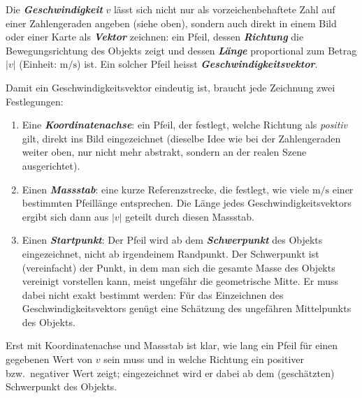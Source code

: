 \documentclass[addpoints,11pt,a4paper]{exam}
\begin{document}
\begin{theoriebox}
Die \textbf{\emph{Geschwindigkeit}} $v$ lässt sich nicht nur als
vorzeichenbehaftete Zahl auf einer Zahlengeraden angeben (siehe oben),
sondern auch direkt in einem Bild oder einer Karte als
\textbf{\emph{Vektor}} zeichnen: ein Pfeil, dessen \textbf{\emph{Richtung}}
die Bewegungsrichtung des Objekts zeigt und dessen \textbf{\emph{Länge}}
proportional zum Betrag $\lvert v\rvert$ (Einheit: $\si{\meter\per\second}$)
ist. Ein solcher Pfeil heisst \textbf{\emph{Geschwindigkeitsvektor}}.

Damit ein Geschwindigkeitsvektor eindeutig ist, braucht jede Zeichnung
zwei Festlegungen:

\begin{enumerate}[leftmargin=1.2cm,itemsep=0.25em]
  \item Eine \textbf{\emph{Koordinatenachse}}: ein Pfeil, der festlegt,
  welche Richtung als \emph{positiv} gilt, direkt ins Bild eingezeichnet
  (dieselbe Idee wie bei der Zahlengeraden weiter oben, nur nicht mehr
  abstrakt, sondern an der realen Szene ausgerichtet).
  \item Einen \textbf{\emph{Massstab}}: eine kurze Referenzstrecke, die
  festlegt, wie viele $\si{\meter\per\second}$ einer bestimmten Pfeillänge
  entsprechen. Die Länge jedes Geschwindigkeitsvektors ergibt sich dann
  aus $\lvert v\rvert$ geteilt durch diesen Massstab.
  \item Einen \textbf{\emph{Startpunkt}}: Der Pfeil wird ab dem
  \textbf{\emph{Schwerpunkt}} des Objekts eingezeichnet, nicht ab
  irgendeinem Randpunkt. Der Schwerpunkt ist (vereinfacht) der Punkt, in
  dem man sich die gesamte Masse des Objekts vereinigt vorstellen kann,
  meist ungefähr die geometrische Mitte. Er muss dabei nicht exakt
  bestimmt werden: Für das Einzeichnen des Geschwindigkeitsvektors genügt
  eine Schätzung des ungefähren Mittelpunkts des Objekts.
\end{enumerate}

Erst mit Koordinatenachse und Massstab ist klar, wie lang ein Pfeil für
einen gegebenen Wert von $v$ sein muss und in welche Richtung ein
positiver bzw.\ negativer Wert zeigt; eingezeichnet wird er dabei ab dem
(geschätzten) Schwerpunkt des Objekts.


\end{theoriebox}
\end{document}
